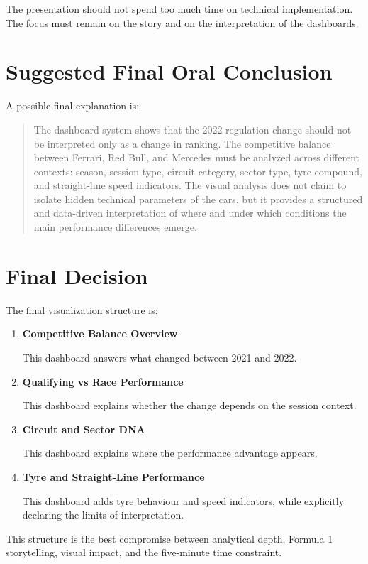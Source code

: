 \documentclass[12pt,a4paper]{article}
\begin{document}
	The presentation should not spend too much time on technical implementation.
	The focus must remain on the story and on the interpretation of the dashboards.
	
	\section{Suggested Final Oral Conclusion}
	
	A possible final explanation is:
	
	\begin{quote}
		The dashboard system shows that the 2022 regulation change should not be interpreted only as a change in ranking. The competitive balance between Ferrari, Red Bull, and Mercedes must be analyzed across different contexts: season, session type, circuit category, sector type, tyre compound, and straight-line speed indicators. The visual analysis does not claim to isolate hidden technical parameters of the cars, but it provides a structured and data-driven interpretation of where and under which conditions the main performance differences emerge.
	\end{quote}
	
	\section{Final Decision}
	
	The final visualization structure is:
	
	\begin{enumerate}[leftmargin=1.2cm]
		\item \textbf{Competitive Balance Overview}
		
		This dashboard answers what changed between 2021 and 2022.
		
		\item \textbf{Qualifying vs Race Performance}
		
		This dashboard explains whether the change depends on the session context.
		
		\item \textbf{Circuit and Sector DNA}
		
		This dashboard explains where the performance advantage appears.
		
		\item \textbf{Tyre and Straight-Line Performance}
		
		This dashboard adds tyre behaviour and speed indicators, while explicitly declaring the limits of interpretation.
	\end{enumerate}
	
	This structure is the best compromise between analytical depth, Formula 1 storytelling, visual impact, and the five-minute time constraint.
	
\end{document}
